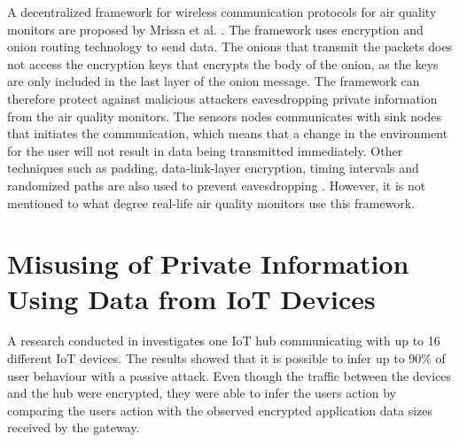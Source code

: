A decentralized framework for wireless communication protocols for air quality monitors are proposed by Mrissa et al. \cite{PrivacyAndFrameworkDecentAQM}. The framework uses encryption and onion routing technology to send data. The onions that transmit the packets does not access the encryption keys that encrypts the body of the onion, as the keys are only included in the last layer of the onion message. The framework can therefore protect against malicious attackers eavesdropping private information from the air quality monitors. The sensors nodes communicates with sink nodes that initiates the communication, which means that a change in the environment for the user will not result in data being transmitted immediately. Other techniques such as padding, data-link-layer encryption, timing intervals and randomized paths are also used to prevent eavesdropping \cite{PrivacyAndFrameworkDecentAQM}. However, it is not mentioned to what degree real-life air quality monitors use this framework. 

\section{Misusing of Private Information Using Data from \gls{IoT} Devices}
A research conducted in \cite{PassiveInferenceIoT} investigates one \gls{IoT} hub communicating with up to 16 different \gls{IoT} devices. The results showed that it is possible to infer up to 90\% of user behaviour with a passive attack. Even though the traffic between the devices and the hub were encrypted, they were able to infer the users action by comparing the users action with the observed encrypted application data sizes received by the gateway. 

